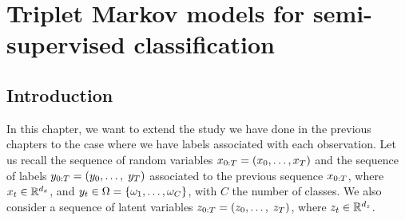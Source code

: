 \chapter{Triplet Markov models for semi-supervised classification}
\label{chap:semi_supervised_pmc_tmc}


\localtableofcontents
\pagebreak



\pagebreak

\section{Introduction}
\label{sec:introduction_ch3}

In this chapter, we want to extend the study we have done in the previous chapters
to the case where we have labels associated with each observation.
Let us recall the sequence of random variables $x_{0:T}=(x_{0}, \dots, x_{T})$
and the sequence of labels $y_{0:T}=(y_{0}, \dots,\; y_{T})$ associated to 
the previous sequence $x_{0:T}$, 
where $x_t \in \mathbb{R}^{d_x}$, and $y_t \in \Omega=\{\omega_1,\dots,\omega_C\}$, 
with $C$ the number of classes.
We also consider a sequence of latent variables 
$z_{0:T}=(z_{0}, \dots,\; z_{T})$, where  
$z_t \in \mathbb{R}^{d_{z}}$.


